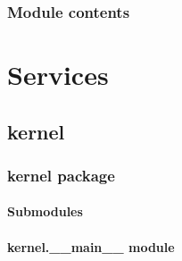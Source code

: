 \documentclass[letterpaper,10pt,english]{sphinxmanual}
\begin{document}
\begin{fulllineitems}
\label{\detokenize{cli:cli.__main__.main}}
\pysigstartsignatures
{}
\pysigstopsignatures
\end{fulllineitems}



\subsection{Module contents}
\label{\detokenize{cli:module-cli}}\label{\detokenize{cli:module-contents}}

\chapter{Services}
\label{\detokenize{modules:services}}
\sphinxstepscope


\section{kernel}
\label{\detokenize{services/modules:kernel}}\label{\detokenize{services/modules::doc}}
\sphinxstepscope


\subsection{kernel package}
\label{\detokenize{services/kernel:kernel-package}}\label{\detokenize{services/kernel::doc}}

\subsubsection{Submodules}
\label{\detokenize{services/kernel:submodules}}

\subsubsection{kernel.\_\_main\_\_ module}
\label{\detokenize{services/kernel:module-kernel.__main__}}\label{\detokenize{services/kernel:kernel-main-module}}
\end{document}
